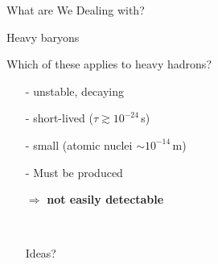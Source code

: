 \begin{frame}{What are We Dealing with?}
\begin{minipage}[t]{0.39\textwidth}
\begin{tikzpicture}[yscale = 1.2,xscale=0.6]
    \end{tikzpicture}
Heavy baryons
           \end{minipage}
            \begin{minipage}[t]{0.59\textwidth}
Which of these applies to heavy hadrons? %
\begin{center}
        \begin{itemize}
            \item[-] unstable, decaying
            \item[-] short-lived {\small($\tau \gtrsim 10^{-24}$\,s)}
                        \item[-] small {\small(atomic nuclei $\sim 10^{-14}\,$m})
            \item[-] Must be produced
            \item [$\Rightarrow$] \textbf{not easily detectable}
            \\\item [\,]
            \item [\ding{43}] Ideas?
        \end{itemize}
        \end{center}
      \end{minipage}
    \end{frame}
    \subsection{}

